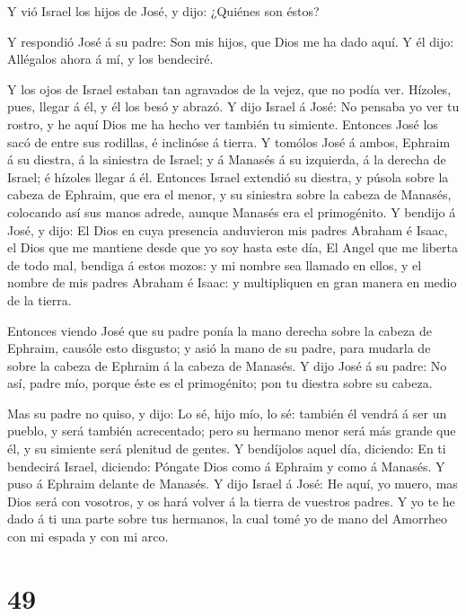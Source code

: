  Y vió Israel los hijos de José, y dijo: ¿Quiénes son éstos?

 Y respondió José á su padre: Son mis hijos, que Dios me ha
dado aquí. Y él dijo: Allégalos ahora á mí, y los bendeciré.

 Y los ojos de Israel estaban tan agravados de la vejez,
que no podía ver. Hízoles, pues, llegar á él, y él los besó y abrazó.
 Y dijo Israel á José: No pensaba yo ver tu rostro, y he
aquí Dios me ha hecho ver también tu simiente.  Entonces
José los sacó de entre sus rodillas, é inclinóse á tierra. 
Y tomólos José á ambos, Ephraim á su diestra, á la siniestra de Israel;
y á Manasés á su izquierda, á la derecha de Israel; é hízoles llegar á
él.  Entonces Israel extendió su diestra, y púsola sobre la
cabeza de Ephraim, que era el menor, y su siniestra sobre la cabeza de
Manasés, colocando así sus manos adrede, aunque Manasés era el
primogénito.  Y bendijo á José, y dijo: El Dios en cuya
presencia anduvieron mis padres Abraham é Isaac, el Dios que me mantiene
desde que yo soy hasta este día,  El Angel que me liberta
de todo mal, bendiga á estos mozos: y mi nombre sea llamado en ellos, y
el nombre de mis padres Abraham é Isaac: y multipliquen en gran manera
en medio de la tierra.

 Entonces viendo José que su padre ponía la mano derecha
sobre la cabeza de Ephraim, causóle esto disgusto; y asió la mano de su
padre, para mudarla de sobre la cabeza de Ephraim á la cabeza de
Manasés.  Y dijo José á su padre: No así, padre mío, porque
éste es el primogénito; pon tu diestra sobre su cabeza.

 Mas su padre no quiso, y dijo: Lo sé, hijo mío, lo sé:
también él vendrá á ser un pueblo, y será también acrecentado; pero su
hermano menor será más grande que él, y su simiente será plenitud de
gentes.  Y bendíjolos aquel día, diciendo: En ti bendecirá
Israel, diciendo: Póngate Dios como á Ephraim y como á Manasés. Y puso á
Ephraim delante de Manasés.  Y dijo Israel á José: He aquí,
yo muero, mas Dios será con vosotros, y os hará volver á la tierra de
vuestros padres.  Y yo te he dado á ti una parte sobre tus
hermanos, la cual tomé yo de mano del Amorrheo con mi espada y con mi
arco.

\hypertarget{section-48}{%
\section{49}\label{section-48}}

